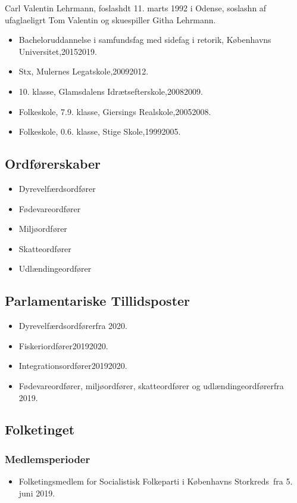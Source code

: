 \documentclass[11pt, a4paper]{awesome-cv}
\begin{document}
\makecvheader[R]
\makelettertitle
\begin{cvletter}
Carl Valentin Lehrmann, foslashdt 11. marts 1992 i Odense, soslashn af ufaglaeligrt Tom Valentin og skuespiller Githa Lehrmann.

\begin{itemize}
\item Bacheloruddannelse i samfundsfag med sidefag i retorik, Københavns Universitet,20152019.
\item Stx, Mulernes Legatskole,20092012.
\item 10. klasse, Glamsdalens Idrætsefterskole,20082009.
\item Folkeskole, 7.9. klasse, Giersings Realskole,20052008.
\item Folkeskole, 0.6. klasse, Stige Skole,19992005.
\end{itemize}
\subsection*{Ordførerskaber}
\begin{itemize}
\item Dyrevelfærdsordfører
\item Fødevareordfører
\item Miljøordfører
\item Skatteordfører
\item Udlændingeordfører
\end{itemize}
\subsection*{Parlamentariske Tillidsposter}
\begin{itemize}
\item Dyrevelfærdsordførerfra 2020.
\item Fiskeriordfører20192020.
\item Integrationsordfører20192020.
\item Fødevareordfører, miljøordfører, skatteordfører og udlændingeordførerfra 2019.
\end{itemize}
\subsection*{Folketinget}
\subsubsection*{Medlemsperioder}
\begin{itemize}
\item Folketingsmedlem for Socialistisk Folkeparti i Københavns Storkreds fra 5. juni 2019.
\end{itemize}

\end{cvletter}
\end{document}

